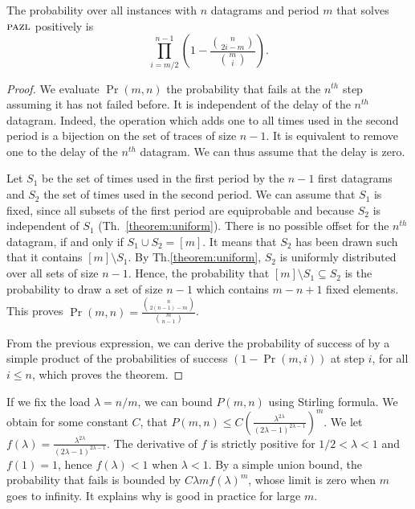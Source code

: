 \begin{theorem}\label{theorem:uniform}
The probability over all instances with $n$ datagrams and period $m$ that \greedyuniform solves $\textsc{pazl}$ positively is $$\displaystyle{\prod_{i=m/2}^{n-1}(1 - \frac{\binom{n}{2i-m}}{\binom{m}{i}})}.$$
\end{theorem}
\begin{proof}
We evaluate $\Pr(m,n)$ the probability that \greedyuniform fails at the $n^{th}$ step assuming it has not failed before. It is independent of the delay of the $n^{th}$ datagram. Indeed, the operation which adds one to all times used 
in the second period is a bijection on the set of traces of size $n-1$. It is equivalent to remove one to the delay of the $n^{th}$ datagram. We can thus assume that the delay is zero.

Let $S_1$ be the set of times used in the first period by the $n-1$ first datagrams
and $S_2$ the set of times used in the second period. We can assume that $S_1$ is fixed, since all subsets of the first period are equiprobable and because $S_2$ is independent of $S_1$ (Th.~\ref{theorem:uniform}). There is no possible offset for the $n^{th}$ datagram, if and only if $S_1 \cup S_2 = [m]$. It means that $S_2$ has been drawn such that it contains $[m] \setminus S_1$. By Th.\ref{theorem:uniform}, $S_2$ is uniformly distributed over all sets of size $n-1$. Hence, the probability that  $[m]  \setminus S_1 \subseteq S_2$  is the probability to draw a set of size $n-1$ which contains $m-n + 1$ fixed elements. This proves $\Pr(m,n) = \frac{\binom{n}{2(n-1)-m}}{\binom{m}{n-1}}$.

From the previous expression, we can derive the probability of success of \greedyuniform by a simple product of 
the probabilities of success $(1 - \Pr(m,i))$ at step $i$, for all $i \leq n$, which proves the theorem. 
\end{proof}


If we fix the load $\lambda = n/m$, we can bound $P(m,n)$ using Stirling formula. We obtain for some constant $C$, 
that $P(m,n) \leq C \left(\frac{\lambda^{2\lambda}}{(2\lambda -1)^{2\lambda -1}}\right)^m$.
We let $f(\lambda) = \frac{\lambda^{2\lambda}}{(2\lambda -1)^{2\lambda -1}}$.
The derivative of $f$ is strictly positive for $1/2 < \lambda < 1$ and $f(1) = 1$, hence 
$f(\lambda) < 1$ when $\lambda < 1$. By a simple union bound, the probability that \greedyuniform fails is bounded 
by $C \lambda m f(\lambda)^m$, whose limit is zero when $m$ goes to infinity. 
It explains why \greedyuniform is good in practice for large $m$. 




